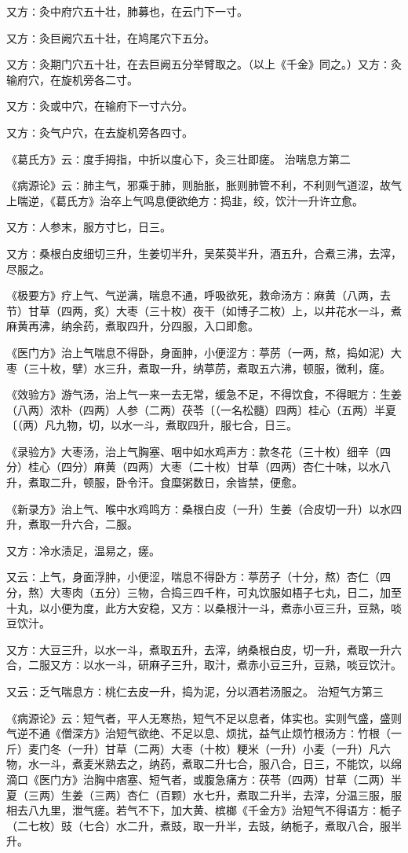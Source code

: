 \documentclass[a4paper,12pt,UTF8,twoside]{ctexbook}
\begin{document}
又方∶灸中府穴五十壮，肺募也，在云门下一寸。

又方∶灸巨阙穴五十壮，在鸠尾穴下五分。

又方∶灸期门穴五十壮，在去巨阙五分举臂取之。（以上《千金》同之。）又方∶灸输府穴，在旋机旁各二寸。

又方∶灸或中穴，在输府下一寸六分。

又方∶灸气户穴，在去旋机旁各四寸。

《葛氏方》云∶度手拇指，中折以度心下，灸三壮即瘥。
治喘息方第二

《病源论》云∶肺主气，邪乘于肺，则胎胀，胀则肺管不利，不利则气道涩，故气上喘逆，《葛氏方》治卒上气鸣息便欲绝方∶捣韭，绞，饮汁一升许立愈。

又方∶人参末，服方寸匕，日三。

又方∶桑根白皮细切三升，生姜切半升，吴茱萸半升，酒五升，合煮三沸，去滓，尽服之。

《极要方》疗上气、气逆满，喘息不通，呼吸欲死，救命汤方∶麻黄（八两，去节）甘草（四两，炙）大枣（三十枚）夜干（如博子二枚）上，以井花水一斗，煮麻黄再沸，纳余药，煮取四升，分四服，入口即愈。

《医门方》治上气喘息不得卧，身面肿，小便涩方∶葶苈（一两，熬，捣如泥）大枣（三十枚，擘）水三升，煮取一升，纳葶苈，煮取五六沸，顿服，微利，瘥。

《效验方》游气汤，治上气一来一去无常，缓急不足，不得饮食，不得眠方∶生姜（八两）浓朴（四两）人参（二两）茯苓〔（一名松髓）四两〕桂心（五两）半夏〔（两）凡九物，切，以水一斗，煮取四升，服七合，日三。

《录验方》大枣汤，治上气胸塞、咽中如水鸡声方∶款冬花（三十枚）细辛（四分）桂心（四分）麻黄（四两）大枣（二十枚）甘草（四两）杏仁十味，以水八升，煮取二升，顿服，卧令汗。食糜粥数日，余皆禁，便愈。

《新录方》治上气、喉中水鸡鸣方∶桑根白皮（一升）生姜（合皮切一升）以水四升，煮取一升六合，二服。

又方∶冷水渍足，温易之，瘥。

又云∶上气，身面浮肿，小便涩，喘息不得卧方∶葶苈子（十分，熬）杏仁（四分，熬）大枣肉（五分）三物，合捣三四千杵，可丸饮服如梧子七丸，日二，加至十丸，以小便为度，此方大安稳，又方∶以桑根汁一斗，煮赤小豆三升，豆熟，啖豆饮汁。

又方∶大豆三升，以水一斗，煮取五升，去滓，纳桑根白皮，切一升，煮取一升六合，二服又方∶以水一斗，研麻子三升，取汁，煮赤小豆三升，豆熟，啖豆饮汁。

又云∶乏气喘息方∶桃仁去皮一升，捣为泥，分以酒若汤服之。
治短气方第三

《病源论》云∶短气者，平人无寒热，短气不足以息者，体实也。实则气盛，盛则气逆不通《僧深方》治短气欲绝、不足以息、烦扰，益气止烦竹根汤方∶竹根（一斤）麦门冬（一升）甘草（二两）大枣（十枚）粳米（一升）小麦（一升）凡六物，水一斗，煮麦米熟去之，纳药，煮取二升七合，服八合，日三，不能饮，以绵滴口《医门方》治胸中痞塞、短气者，或腹急痛方∶茯苓（四两）甘草（二两）半夏（三两）生姜（三两）杏仁（百颗）水七升，煮取二升半，去滓，分温三服，服相去八九里，泄气瘥。若气不下，加大黄、槟榔《千金方》治短气不得语方∶栀子（二七枚）豉（七合）水二升，煮豉，取一升半，去豉，纳栀子，煮取八合，服半升。
\end{document}
